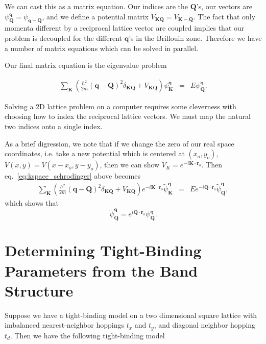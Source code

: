 \documentclass{article}
\theoremstyle{definition}
\begin{document}
We can cast this as a matrix equation. Our indices are the $\mathbf{Q}$'s, our vectors are $\psi^\mathbf{q}_\mathbf{Q} = \psi_{\mathbf{q} - \mathbf{Q}}$, and we define a potential matrix $V_{\mathbf{K}\mathbf{Q}} =  V_{\mathbf{K} - \mathbf{Q}}$. The fact that only momenta different by a reciprocal lattice vector are coupled implies that our problem is decoupled for the different $\mathbf{q}$'s in the Brillouin zone. Therefore we have a number of matrix equations which can be solved in parallel.

Our final matrix equation is the eigenvalue problem

\begin{eqnarray}
\sum_\mathbf{K} \left(\frac{\hbar^2}{2m} (\mathbf{q} - \mathbf{Q})^2 \delta_{\mathbf{K}\mathbf{Q}} + V_{\mathbf{K}\mathbf{Q}} \right) \psi^\mathbf{q}_\mathbf{K} &=& E \psi^\mathbf{q}_\mathbf{Q}. 
\label{eq:kspace_schrodinger}
\end{eqnarray}

Solving a 2D lattice problem on a computer requires some cleverness with choosing how to index the reciprocal lattice vectors. We must map the natural two indices onto a single index.

As a brief digression, we note that if we change the zero of our real space coordinates, i.e. take a new potential which is centered at $(x_o, y_o)$, $\tilde{V}(x,y) = V(x-x_o, y-y_o)$, then we can show $\tilde{V}_K = e^{-i \mathbf{K} \cdot \mathbf{r}_o}$. Then eq.~\ref{eq:kspace_schrodinger} above becomes
\begin{eqnarray}
\sum_\mathbf{K} \left(\frac{\hbar^2}{2m} (\mathbf{q} - \mathbf{Q})^2 \delta_{\mathbf{K}\mathbf{Q}} + V_{\mathbf{K}\mathbf{Q}} \right) e^{-i \mathbf{K} \cdot \mathbf{r}_o}\tilde{\psi}^\mathbf{q}_\mathbf{K} &=& E e^{-i \mathbf{Q} \cdot \mathbf{r}_o} \tilde{\psi}^\mathbf{q}_\mathbf{Q},
\end{eqnarray}
which shows that 
\begin{equation}
\tilde{\psi}^\mathbf{q}_\mathbf{Q} = e^{i \mathbf{Q} \cdot \mathbf{r}_o} \psi^\mathbf{q}_\mathbf{Q}.
\label{eq:bloch_fn_shifted_origin}
\end{equation}

\section{Determining Tight-Binding Parameters from the Band Structure}

Suppose we have a tight-binding model on a two dimensional square lattice with imbalanced nearest-neighbor hoppings $t_x$ and $t_y$, and diagonal neighbor hopping $t_d$. Then we have the following tight-binding model
\end{document}
